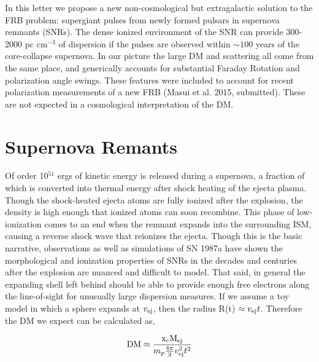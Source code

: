\documentclass[useAMS,usenatbib]{mn2e}
\begin{document}
In this letter we propose a new non-cosmological but extragalactic
solution to the FRB problem: supergiant pulses from newly formed pulsars in 
supernova remnants (SNRs). The dense ionized environment of the SNR
can provide 300-2000 pc cm$^{-3}$ of dispersion if the pulses are observed 
within $\sim100$ years of the core-collapse supernova. In our picture the 
large DM and scattering all come from the same place, and generically
accounts for substantial Faraday Rotation and polarization angle
swings. These features were included to account for recent
polarization measurements of a new FRB (Masui et al. 2015, submitted). 
These are not expected in a cosmological interpretation of the DM.


\section{Supernova Remants}
Of order 10$^{51}$ ergs of kinetic energy is released during a supernova, a 
fraction of which is converted into thermal 
energy after shock heating of the 
ejecta plasma. Though the shock-heated ejecta atoms 
are fully ionized after the explosion, the density is high enough that
ionized atoms can soon recombine.
This phase of low-ionization comes to an end when the remnant expands 
into the surrounding ISM, causing a reverse shock wave that reionizes the ejecta.
Though this is the basic narrative, observations \citep{2014ApJ...796...82Z} 
as well as simulations \citep{2014ApJ...794..174P}
of SN 1987a have shown the morphological and ionization properties of SNRs
in the decades and centuries after the explosion are nuanced and 
difficult to model.
That said, in general the expanding shell left behind 
should be able to provide enough free electrons
along the line-of-sight for unusually large dispersion measures. If we 
assume a toy model in which a sphere expands at $v_{\rm ej}$, 
then the radius R(t) $\approx v_{\rm ej} t$. Therefore the DM we expect can be 
calculated as,

\begin{equation}
\textup{DM} \approx  \frac{\textup{x}_e \textup{M}_{\rm ej}}{m_p \frac{4\pi}{3} v_{\rm ej}^2 t^2}
\end{equation}
\end{document}
